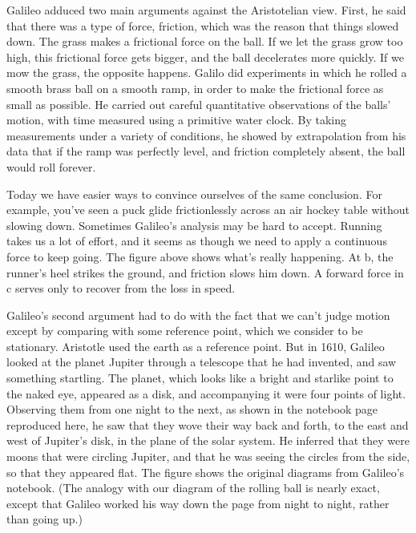 \begin{figure}\label{fig:soccer-ball}
\end{figure}

Galileo adduced two main arguments against the Aristotelian view. First, he said
that there was a type of force, friction, which was the reason that things slowed down.
The grass makes a frictional force on the ball. If we let the grass grow too high,
this frictional force gets bigger, and the ball decelerates more quickly. If we mow
the grass, the opposite happens. Galilo did experiments in which he rolled a smooth
brass ball on a smooth ramp, in order to make the frictional force as small as possible.
He carried out careful quantitative observations of the balls' motion, with time
measured using a primitive water clock. By taking measurements under a variety of
conditions, he showed by extrapolation from his data that if the ramp was perfectly level,
and friction completely absent, the ball would roll forever. 

Today we have easier ways
to convince ourselves of the same conclusion. For example, you've seen a puck glide frictionlessly
across an air hockey table without slowing down.
Sometimes Galileo's analysis may be hard to accept. Running takes us a lot of effort, and
it seems as though we need to apply a continuous force to keep going. The figure above shows what's really
happening. At b, the runner's heel strikes the ground, and friction slows him down. A forward
force in c serves only to recover from the loss in speed.

\begin{figure}\label{fig:runner}
\end{figure}

Galileo's second argument had to do with the fact that we can't judge motion except by
comparing with some reference point, which we consider to be stationary. Aristotle
used the earth as a reference point. 
But in 1610, Galileo looked at the planet Jupiter through a telescope that he had invented, and
saw something startling. The planet, which looks like a bright and starlike point to the naked eye,
appeared as a disk, and accompanying it were four points of light. Observing them from one
night to the next, as shown in the notebook page reproduced here, he saw that they wove their
way back and forth, to the east and west of Jupiter's disk, in the plane of the solar system.
He inferred that they were moons
that were circling Jupiter, and that he was seeing the circles from the side, so
that they appeared flat. The figure  shows the original diagrams from Galileo's notebook.
(The analogy with our diagram of the rolling ball is nearly exact,
except that Galileo worked his way down the page from night to night, rather than going up.)

